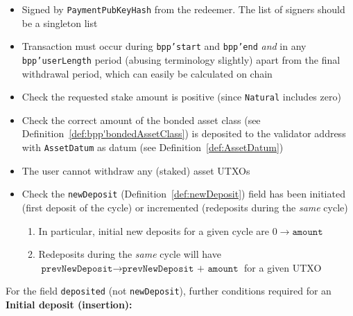 \documentclass[10pt, a4paper]{article}
\theoremstyle{definition}
\begin{document}
\begin{itemize}
\item{Signed by \texttt{PaymentPubKeyHash} from the redeemer. The list of signers should be a singleton list}
\item{Transaction must occur during \texttt{bpp'start} and \texttt{bpp'end} \textit{and} in any \texttt{bpp'userLength} period (abusing terminology slightly) apart from the final withdrawal period, which can easily be calculated on chain}
\item{Check the requested stake amount is positive (since \texttt{Natural} includes zero)}
\item{Check the correct amount of the bonded asset class (see Definition~\ref{def:bpp'bondedAssetClass}) is deposited to the validator address with \texttt{AssetDatum} as datum (see Definition~\ref{def:AssetDatum})}
\item{The user cannot withdraw any (staked) asset UTXOs}
\item{Check the \texttt{newDeposit} (Definition~\ref{def:newDeposit}) field has been initiated (first deposit of the cycle) or incremented (redeposits during the \textit{same} cycle)
\begin{enumerate}
\item{In particular, initial new deposits for a given cycle are $0 \rightarrow \texttt{amount}$}
\item{Redeposits during the \textit{same} cycle will have $\texttt{prevNewDeposit} \rightarrow \texttt{prevNewDeposit + amount}$ for a given UTXO}
\end{enumerate}}
\end{itemize}
For the field \texttt{deposited} (not \texttt{newDeposit}), further conditions required for an \textbf{Initial deposit (insertion):}
\end{document}
